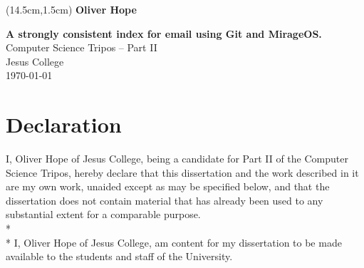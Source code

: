 \documentclass[12pt,a4paper,twoside,openright]{report}
\begin{document}

\thispagestyle{empty}

\begin{textblock*}{5cm}(14.5cm,1.5cm)
  {\LARGE \textbf{Oliver Hope}}
\end{textblock*}


\vspace*{60mm}
\begin{center}
\Huge
\textbf{A strongly consistent index for email using Git and MirageOS.} \\[5mm]
Computer Science Tripos -- Part II \\[5mm]
Jesus College \\[5mm]
\today  %
\end{center}


\pagestyle{plain}

\newpage

\setcounter{page}{1}

\section*{Declaration}

I, Oliver Hope of Jesus College, being a candidate for Part II of the Computer Science Tripos, hereby declare that this dissertation and the work described in it are my own work, unaided except as may be specified below, and that the dissertation does not contain material that has already been used to any substantial extent for a comparable purpose.
\\*
\\*
I, Oliver Hope of Jesus College,
am content for my dissertation to be made available to the students and staff of the University.
\end{document}
